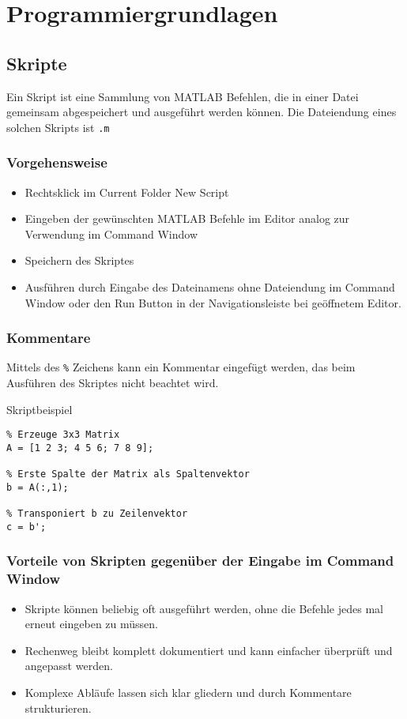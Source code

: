 \section{Programmiergrundlagen}
        \subsection{Skripte}
        Ein Skript ist eine Sammlung von MATLAB Befehlen, die in einer Datei gemeinsam abgespeichert und ausgeführt werden können. Die Dateiendung eines solchen Skripts ist \texttt{.m} 
        \subsubsection*{Vorgehensweise}
        \begin{itemize}
                \item Rechtsklick im Current Folder \textrightarrow New \textrightarrow Script
                \item Eingeben der gewünschten MATLAB Befehle im Editor analog zur Verwendung im Command Window
                \item Speichern des Skriptes
                \item Ausführen durch Eingabe des Dateinamens ohne Dateiendung im Command Window oder den Run Button in der Navigationsleiste bei geöffnetem Editor.
        \end{itemize}
        \subsubsection*{Kommentare}
        Mittels des \texttt{\%} Zeichens kann ein Kommentar eingefügt werden, das beim Ausführen des Skriptes nicht beachtet wird.
        \begin{Codelösung}{Skriptbeispiel}
                \begin{lstlisting}
% Erzeuge 3x3 Matrix
A = [1 2 3; 4 5 6; 7 8 9];

% Erste Spalte der Matrix als Spaltenvektor
b = A(:,1);

% Transponiert b zu Zeilenvektor
c = b';
                \end{lstlisting}
        \end{Codelösung}
        \subsubsection*{Vorteile von Skripten gegenüber der Eingabe im Command Window}
        \begin{itemize}
                \item Skripte können beliebig oft ausgeführt werden, ohne die Befehle jedes mal erneut eingeben zu müssen.
                \item Rechenweg bleibt komplett dokumentiert und kann einfacher überprüft und angepasst werden.
                \item Komplexe Abläufe lassen sich klar gliedern und durch Kommentare strukturieren.
        \end{itemize}
        \clearpage
